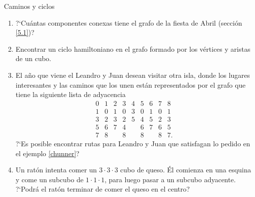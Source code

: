 \begin{section}{Caminos y ciclos}
\begin{enumerate}
\item ?`Cuántas componentes conexas tiene el grafo de la fiesta de Abril (sección \ref{5.1})?
\item Encontrar un ciclo hamiltoniano en el grafo formado por los vértices y aristas de un
cubo.
\item El año que viene el Leandro y Juan desean visitar otra isla, donde los lugares interesantes y las caminos que los unen están representados por el grafo que tiene la siguiente lista de adyacencia
$$
\begin{matrix}
0&1&2&3&4&5&6&7&8\\ \hline
1&0&1&0&3&0&1&0&1\\
3&2&3&2&5&4&5&2&3\\
5&6&7&4&&6&7&6&5\\
7&8&&8&&8&&8&7.
\end{matrix}
$$
?`Es posible encontrar rutas para Leandro y Juan que satisfagan lo pedido en el ejemplo \ref{chunner}?
\item Un ratón intenta comer un $3\cdot 3\cdot 3$ cubo de queso. Él comienza en una esquina y come un subcubo de $1\cdot 1\cdot 1$, para luego pasar a un subcubo  adyacente. ?`Podrá el ratón terminar de comer el queso en el centro?
\end{enumerate}

\end{section}



